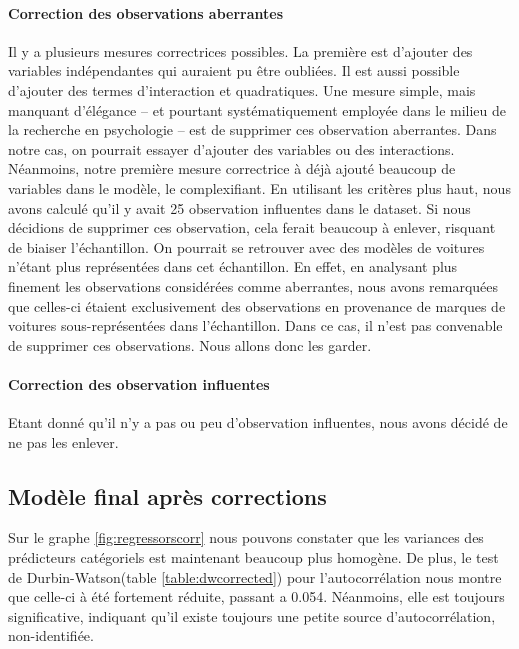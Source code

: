 \documentclass[11pt,a4paper]{article}
\begin{document}
\paragraph{Correction des observations aberrantes}
Il y a plusieurs mesures correctrices possibles. La première est d'ajouter des variables indépendantes qui auraient pu être oubliées. Il est aussi possible d'ajouter des termes d'interaction et quadratiques. Une mesure simple, mais manquant d'élégance -- et pourtant systématiquement employée dans le milieu de la recherche en psychologie -- est de supprimer ces observation aberrantes.  Dans notre cas, on pourrait essayer d'ajouter des variables ou des interactions. Néanmoins, notre première mesure correctrice à déjà ajouté beaucoup de variables dans le modèle, le complexifiant. En utilisant les critères plus haut, nous avons calculé qu'il y avait 25 observation influentes dans le dataset. Si nous décidions de supprimer ces observation, cela ferait beaucoup à enlever, risquant de biaiser l'échantillon.  On pourrait se retrouver avec des modèles de voitures n'étant plus représentées dans cet échantillon. En effet, en analysant plus finement les observations considérées comme aberrantes, nous avons remarquées que celles-ci étaient exclusivement des observations en provenance de marques de voitures sous-représentées dans l'échantillon. Dans ce cas, il n'est pas convenable de supprimer ces observations. Nous allons donc les garder.

\paragraph{Correction des observation influentes} Etant donné qu'il n'y a pas ou peu d'observation influentes, nous avons décidé de ne pas les enlever.


\subsection{Modèle final après corrections}
Sur le graphe \ref{fig:regressorscorr} nous pouvons constater que les variances des prédicteurs catégoriels est maintenant beaucoup plus homogène.
De plus, le test de Durbin-Watson(table \ref{table:dwcorrected}) pour l'autocorrélation nous montre que celle-ci à été fortement réduite, passant a 0.054. Néanmoins, elle est toujours significative, indiquant qu'il existe toujours une petite source d'autocorrélation, non-identifiée.
\end{document}
